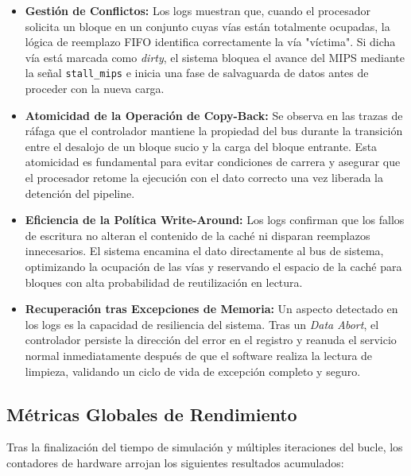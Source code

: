 \documentclass[12pt,a4paper]{article}
\begin{document}
\begin{itemize}
    \item \textbf{Gestión de Conflictos:} 
    Los logs muestran que, cuando el procesador solicita un bloque en un conjunto cuyas vías están totalmente ocupadas, la lógica de reemplazo FIFO identifica correctamente la vía "víctima". Si dicha vía está marcada como \textit{dirty}, el sistema bloquea el avance del MIPS mediante la señal \texttt{stall\_mips} e inicia una fase de salvaguarda de datos antes de proceder con la nueva carga.
    
    \item \textbf{Atomicidad de la Operación de Copy-Back:} 
    Se observa en las trazas de ráfaga que el controlador mantiene la propiedad del bus durante la transición entre el desalojo de un bloque sucio y la carga del bloque entrante. Esta atomicidad es fundamental para evitar condiciones de carrera y asegurar que el procesador retome la ejecución con el dato correcto una vez liberada la detención del pipeline.
    
    \item \textbf{Eficiencia de la Política Write-Around:} 
    Los logs confirman que los fallos de escritura  no alteran el contenido de la caché ni disparan reemplazos innecesarios. El sistema encamina el dato directamente al bus de sistema, optimizando la ocupación de las vías y reservando el espacio de la caché para bloques con alta probabilidad de reutilización en lectura.
    
    \item \textbf{Recuperación tras Excepciones de Memoria:} 
    Un aspecto detectado en los logs es la capacidad de resiliencia del sistema. Tras un \textit{Data Abort}, el controlador persiste la dirección del error en el registro y reanuda el servicio normal inmediatamente después de que el software realiza la lectura de limpieza, validando un ciclo de vida de excepción completo y seguro.
\end{itemize}

\subsection{Métricas Globales de Rendimiento}

Tras la finalización del tiempo de simulación y múltiples iteraciones del bucle, los contadores de hardware arrojan los siguientes resultados acumulados:
\end{document}
